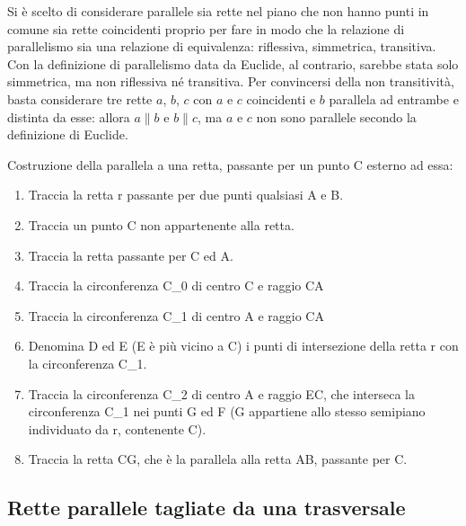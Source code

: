 Si è scelto di considerare 
parallele sia rette nel piano che non hanno punti in comune sia rette 
coincidenti proprio per fare in modo che la relazione di parallelismo 
sia una relazione di equivalenza: riflessiva, simmetrica, transitiva. 
Con la definizione di parallelismo data da Euclide, al contrario, 
sarebbe stata solo simmetrica, ma non riflessiva né transitiva. Per 
convincersi della non transitività, basta considerare tre rette $a$, 
$b$, $c$ con $a$ e $c$ coincidenti e $b$ parallela ad entrambe e 
distinta da esse: allora $a\parallel b$ e $b \parallel c$, ma $a$ e 
$c$ non sono parallele secondo la definizione di Euclide.

\begin{procedura}
  Costruzione della parallela a una retta, passante per un punto C esterno ad 
essa:
  \begin{enumerate} [nosep]
    \item 
    Traccia la retta r  passante per due punti qualsiasi A e B.
    \item 
    Traccia un punto C non appartenente alla retta.
    \item 
    Traccia la retta passante per C ed A. 
    \item 
    Traccia la circonferenza C\_0 di centro C e raggio CA  
    \item       
    Traccia la circonferenza C\_1 di centro A e raggio CA
    \item   
    Denomina D ed E (E è più vicino a C) i punti di intersezione della retta r 
con la circonferenza C\_1.  
    \item 
    Traccia la circonferenza C\_2 di centro A e raggio EC, che 
interseca la circonferenza C\_1 nei punti G ed F (G appartiene allo stesso 
semipiano individuato da r, contenente C).
    \item
    Traccia la retta CG, che è la parallela alla retta AB, passante per C.
  \end{enumerate}
\end{procedura}

\subsection{Rette parallele tagliate da una trasversale}

